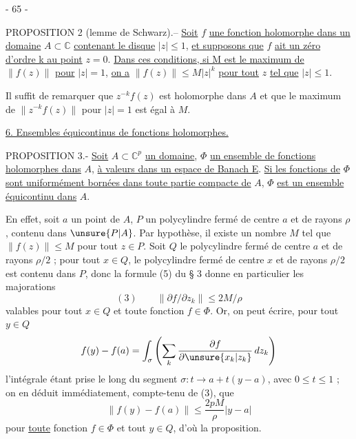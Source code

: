 \begin{center}- 65 -\end{center}
PROPOSITION 2 (lemme de Schwarz).-- \uline{Soit} $f$ \uline{une fonction holomorphe dans un domaine} $A\subset\mathbb C$ \uline{contenant le disque} $|z|\leq1$, \uline{et supposons que} $f$ \uline{ait un zéro d'ordre k au point} $z=0$. \uline{Dans ces conditions, si M est le maximum de} $\|f(z)\|$ \uline{pour} $|z|=1$, \uline{on a} $\|f(z)\|\leq M|z|^k$ \uline{pour tout} $z$ \uline{tel que} $|z|\leq1$.

Il suffit de remarquer que $z^{-k}f(z)$ est holomorphe dans $A$ et que le maximum de $\|z^{-k}f(z)\|$ pour $|z|=1$ est égal à $M$.

\uline{6. Ensembles équicontinus de fonctions holomorphes.}

PROPOSITION 3.- \uline{Soit} $A\subset\mathbb C^p$ \uline{un domaine}, $\Phi$ \uline{un ensemble de fonctions holomorphes dans} $A$, \uline{à valeurs dans un espace de Banach E}. \uline{Si les fonctions de} $\Phi$ \uline{sont uniformément bornées dans toute partie compacte de} $A$, $\Phi$ \uline{est un ensemble équicontinu dans} $A$.

En effet, soit $a$ un point de $A$, $P$ un polycylindre fermé de centre $a$ et de rayons $\rho$, contenu dans $\unsure{P|A}$. Par hypothèse, il existe un nombre $M$ tel que $\|f(z)\|\leq M$ pour tout $z\in P$. Soit $Q$ le polycylindre fermé de centre $a$ et de rayons $\rho/2$ ; pour tout $x\in Q$, le polycylindre fermé de centre $x$ et de rayons $\rho/2$ est contenu dans $P$, donc la formule (5) du § 3 donne en particulier les majorations
\[
(3)\qquad\|\partial f/\partial z_k\|\leq2M/\rho
\]
valables pour tout $x\in Q$ et toute fonction $f\in\Phi$. Or, on peut écrire, pour tout $y\in Q$
\[
f(y)-f(a)=\int_\sigma\left(\sum_k\frac{\partial f}{\partial\unsure{x_k|z_k}}\,dz_k\right)
\]
l'intégrale étant prise le long du segment $\sigma:t\longrightarrow a+t(y-a)$, avec $0\leq t\leq1$ ; on en déduit immédiatement, compte-tenu de (3), que
\[
\|f(y)-f(a)\|\leq\frac{2pM}{\rho}|y-a|
\]
pour \uline{toute} fonction $f\in\Phi$ et tout $y\in Q$, d'où la proposition.
